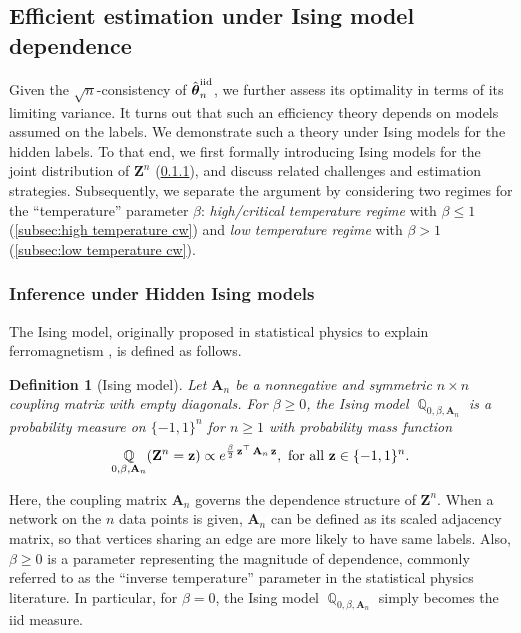 \documentclass[preprint,reqno]{imsart}
\newtheorem{defi}{Definition}[section]
\DeclareMathOperator{\bz}{\textbf{z}}
\DeclareMathOperator{\QQ}{\mathbb{Q}}
\newcommand{\A}{\mathbf{A}}
\newcommand{\Z}{\mathbf{Z}}
\newcommand{\thetaiid}{\hat{\boldsymbol \theta}^{\text{iid}}_{\mathnormal n}}
\begin{document}
\subsection{Efficient estimation under Ising model dependence}\label{sec:Curie-Weiss}
Given the $\sqrt{n}$-consistency of $\thetaiid$, we further assess its optimality in terms of its limiting variance. It turns out that such an efficiency theory depends on models assumed on the labels. We demonstrate such a theory under Ising models for the hidden labels. To that end, 
%
we first formally introducing Ising models for the joint distribution of $\mathbf{Z}^n$ (\cref{subsec:hidden_ising_model}), and discuss related challenges and estimation strategies. Subsequently, we separate the argument by considering two regimes for the ``temperature'' parameter $\beta$: \emph{high/critical temperature regime} with $\beta \le 1$ (\cref{subsec:high temperature cw}) and \emph{low temperature regime} with $\beta > 1$ (\cref{subsec:low temperature cw}). 

%
\vspace{2mm}
\noindent 
\subsubsection{Inference under Hidden Ising models}\label{subsec:hidden_ising_model}
The Ising model, originally proposed in statistical physics to explain ferromagnetism \citep{ising1924beitrag}, is defined as follows.

\begin{defi}[Ising model]\label{def:ising}
    Let $\A_n$ be a nonnegative and symmetric $n \times n$ coupling matrix with empty diagonals.
    For $\beta \ge 0$, the Ising model $\QQ_{0, \beta, \A_n}$ is a probability measure on $\{-1, 1\}^n$ for $n\geq 1$ with probability mass function
    \begin{align*}
        \QQ_{0, \beta, \A_n} (\Z^n = \bz) \propto e^{\frac{\beta}{2} \bz^{\top} \mathbf{A}_n \bz}, ~ \textnormal{for all } \mathbf{z} \in \{-1,1\}^n.
    \end{align*}
\end{defi}

Here, the coupling matrix $\A_n$ governs the dependence structure of $\Z^n$. When a network on the $n$ data points is given, $\A_n$ can be defined as its scaled adjacency matrix, so that vertices sharing an edge are more likely to have same labels.
Also, $\beta \ge 0$ is a parameter representing the magnitude of dependence, commonly referred to as the ``inverse temperature'' parameter in the statistical physics literature. In particular, for $\beta = 0$, the Ising model $\QQ_{0, \beta, \A_n}$ simply becomes the iid measure.
%
\end{document}
